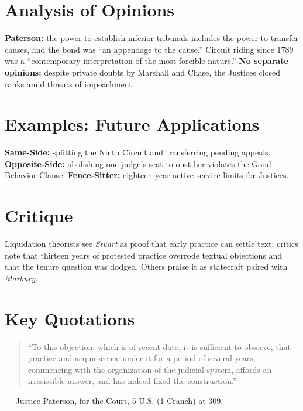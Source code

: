 \documentclass[12pt]{article}
\begin{document}
\section{Analysis of Opinions}
\textbf{Paterson:} the power to establish inferior tribunals includes the power to transfer causes, and the bond was ``an appendage to the cause.'' Circuit riding since 1789 was a ``contemporary interpretation of the most forcible nature.'' \textbf{No separate opinions:} despite private doubts by Marshall and Chase, the Justices closed ranks amid threats of impeachment.

\section{Examples: Future Applications}
\textbf{Same-Side:} splitting the Ninth Circuit and transferring pending appeals. \textbf{Opposite-Side:} abolishing one judge's seat to oust her violates the Good Behavior Clause. \textbf{Fence-Sitter:} eighteen-year active-service limits for Justices.

\section{Critique}
Liquidation theorists see \textit{Stuart} as proof that early practice can settle text; critics note that thirteen years of protested practice overrode textual objections and that the tenure question was dodged. Others praise it as statecraft paired with \textit{Marbury}.

\section{Key Quotations}
\begin{quote}
``To this objection, which is of recent date, it is sufficient to observe, that practice and acquiescence under it for a period of several years, commencing with the organization of the judicial system, affords an irresistible answer, and has indeed fixed the construction.''
\end{quote}
\noindent --- Justice Paterson, for the Court, 5 U.S. (1 Cranch) at 309.
\end{document}
